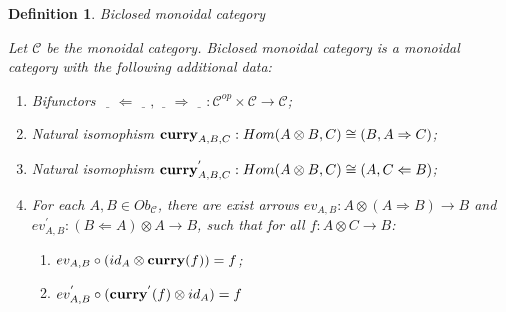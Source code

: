 \documentclass[a4paper]{article}
\newtheorem{defin}{Definition}
\begin{document}
\begin{defin} Biclosed monoidal category

  Let $\mathcal{C}$ be the monoidal category. Biclosed monoidal category is a monoidal category with the following additional data:
  \begin{enumerate}
    \item Bifunctors $\underline{\quad} \Leftarrow \underline{\quad}, \underline{\quad} \Rightarrow \underline{\quad} : \mathcal{C}^{op} \times \mathcal{C} \to \mathcal{C}$;
    \item Natural isomophism ${\bf curry}_{A,B,C} : Hom (A \otimes B, C) \cong (B, A \Rightarrow C)$;
    \item Natural isomophism ${\bf curry}^{'}_{A,B,C} : Hom (A \otimes B, C) \cong (A, C \Leftarrow B)$;
    \item For each $A, B \in Ob_{\mathcal{C}}$, there are exist arrows $ev_{A,B} : A \otimes (A \Rightarrow B) \rightarrow B$ and $ev_{A,B}^{'} : (B \Leftarrow A) \otimes A \rightarrow B$,
    such that for all $f : A \otimes C \rightarrow B$:
      \begin{enumerate}
        \item $ev_{A,B} \circ (id_A \otimes {\bf curry}(f)) = f$;
        \item $ev_{A,B}^{'} \circ ({\bf curry}^{'}(f) \otimes id_A) = f$
      \end{enumerate}
  \end{enumerate}
\end{defin}
\end{document}
